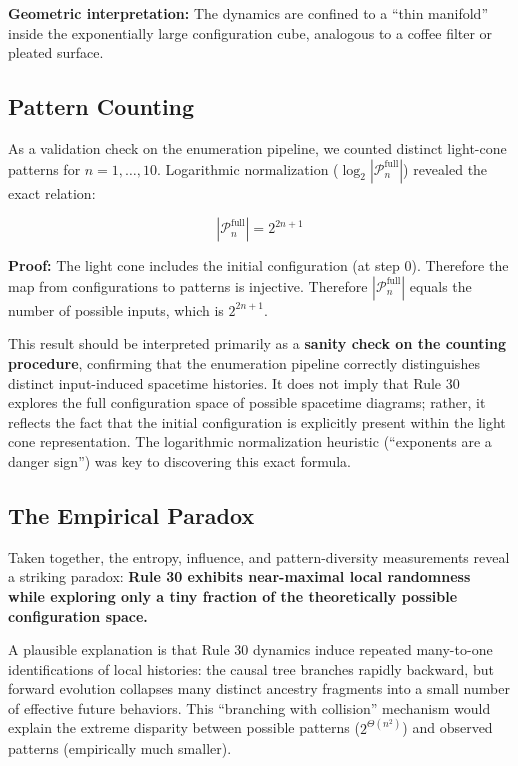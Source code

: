 \documentclass[11pt]{article}
\begin{document}
\textbf{Geometric interpretation:} The dynamics are confined to a ``thin manifold'' inside the exponentially large configuration cube, analogous to a coffee filter or pleated surface.

\subsection{Pattern Counting}

As a validation check on the enumeration pipeline, we counted distinct light-cone patterns for $n=1,\ldots,10$. Logarithmic normalization ($\log_2 |\mathcal{P}_n^{\text{full}}|$) revealed the exact relation:

\begin{equation}
|\mathcal{P}_n^{\text{full}}| = 2^{2n+1}
\end{equation}

\textbf{Proof:} The light cone includes the initial configuration (at step 0). Therefore the map from configurations to patterns is injective. Therefore $|\mathcal{P}_n^{\text{full}}|$ equals the number of possible inputs, which is $2^{2n+1}$.

This result should be interpreted primarily as a \textbf{sanity check on the counting procedure}, confirming that the enumeration pipeline correctly distinguishes distinct input-induced spacetime histories. It does not imply that Rule 30 explores the full configuration space of possible spacetime diagrams; rather, it reflects the fact that the initial configuration is explicitly present within the light cone representation. The logarithmic normalization heuristic (``exponents are a danger sign'') was key to discovering this exact formula.

\subsection{The Empirical Paradox}

Taken together, the entropy, influence, and pattern-diversity measurements reveal a striking paradox: \textbf{Rule 30 exhibits near-maximal local randomness while exploring only a tiny fraction of the theoretically possible configuration space.}

A plausible explanation is that Rule 30 dynamics induce repeated many-to-one identifications of local histories: the causal tree branches rapidly backward, but forward evolution collapses many distinct ancestry fragments into a small number of effective future behaviors. This ``branching with collision'' mechanism would explain the extreme disparity between possible patterns ($2^{\Theta(n^2)}$) and observed patterns (empirically much smaller).
\end{document}
